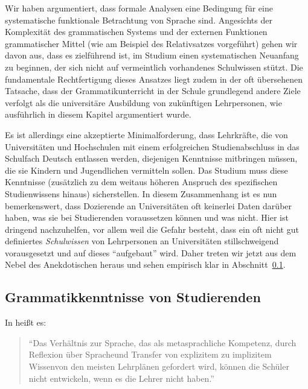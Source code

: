 Wir haben argumentiert, dass formale Analysen eine Bedingung für eine systematische funktionale Betrachtung von Sprache sind.
Angesichts der Komplexität des grammatischen Systems und der externen Funktionen grammatischer Mittel (wie am Beispiel des Relativsatzes vorgeführt) gehen wir davon aus, dass es zielführend ist, im Studium einen systematischen Neuanfang zu beginnen, der sich nicht auf vermeintlich vorhandenes Schulwissen stützt.
Die fundamentale Rechtfertigung dieses Ansatzes liegt zudem in der oft übersehenen Tatsache, dass der Grammatikunterricht in der Schule grundlegend andere Ziele verfolgt als die universitäre Ausbildung von zukünftigen Lehrpersonen, wie ausführlich in diesem Kapitel argumentiert wurde.

Es ist allerdings eine akzeptierte Minimalforderung, dass Lehrkräfte, die von Universitäten und Hochschulen mit einem erfolgreichen Studienabschluss in das Schulfach Deutsch entlassen werden, diejenigen Kenntnisse mitbringen müssen, die sie Kindern und Jugendlichen vermitteln sollen.
Das Studium muss diese Kenntnisse (zusätzlich zu dem weitaus höheren Anspruch des spezifischen Studienwissens hinaus) sicherstellen.
In diesem Zusammenhang ist es nun bemerkenswert, dass Dozierende an Universitäten oft keinerlei Daten darüber haben, was sie bei Studierenden voraussetzen können und was nicht.
Hier ist dringend nachzuhelfen, vor allem weil die Gefahr besteht, dass ein oft nicht gut definiertes \textit{Schulwissen} von Lehrpersonen an Universitäten stillschweigend vorausgesetzt und auf dieses "`aufgebaut"' wird.
Daher treten wir jetzt aus dem Nebel des Anekdotischen heraus und sehen empirisch klar in Abschnitt~\ref{sec:grammatikkentnissevonstudierenden}.


\subsection{Grammatikkenntnisse von Studierenden}
\label{sec:grammatikkentnissevonstudierenden}

In \citet{Eisenberg2004} heißt es:

\begin{quote}
  "`Das Verhältnis zur Sprache, das als \glq metasprachliche Kompetenz\grq, durch \glq Reflexion über Sprache\grq und \glq Transfer von explizitem zu implizitem Wissen\grq von den meisten Lehrplänen gefordert wird, können die Schüler nicht entwickeln, wenn es die Lehrer nicht haben."' \citep[23]{Eisenberg2004}
\end{quote}


